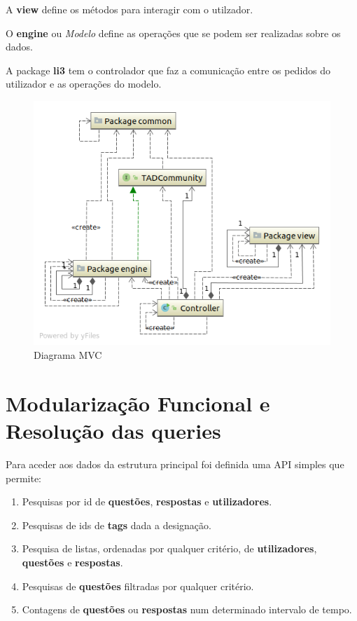 \documentclass[10pt,a4paper]{report}
\begin{document}
    A \textbf{view} define os métodos para interagir com o utilzador.

    O \textbf{engine} ou \textit{Modelo} define as operações que se podem
    ser realizadas sobre os dados.

    A package \textbf{li3} tem o controlador que faz a comunicação entre os
    pedidos do utilizador e as operações do modelo.

    \begin{figure}[h]
        \centering
        \includegraphics[width=\textwidth]{./images/Top-LevelPackage.png}
        \caption{Diagrama MVC}
    \end{figure}

\chapter{Modularização Funcional e Resolução das queries}
    Para aceder aos dados da estrutura principal foi definida uma API
    simples que permite:
    \begin{enumerate}[1.]
        \item Pesquisas por id de \textbf{questões}, \textbf{respostas} e
        \textbf{utilizadores}.
        \item Pesquisas de ids de \textbf{tags} dada a designação.
        \item Pesquisa de listas, ordenadas por qualquer critério, de
        \textbf{utilizadores}, \textbf{questões} e \textbf{respostas}.
        \item Pesquisas de \textbf{questões} filtradas por qualquer critério.
        \item Contagens de \textbf{questões} ou \textbf{respostas}
              num determinado intervalo de tempo.
    \end{enumerate}
\end{document}
